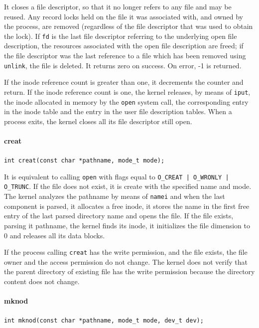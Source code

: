 \documentclass{report}
\begin{document}
It closes a file descriptor, so that it no longer refers to any file and may be reused. Any record locks held on the file it was associated with, and owned by the process, are removed (regardless of the file descriptor that was used to obtain the lock). If \texttt{fd} is the last file descriptor referring to the underlying open file description, the resources associated with the open file description are freed; if the file descriptor was the last reference to a file which has been removed using \texttt{unlink}, the file is deleted. It returns zero on success. On error, -1 is returned.

If the inode reference count is greater than one, it decrements the counter and return. If the inode reference count is one, the kernel releases, by means of \texttt{iput}, the inode allocated in memory by the \texttt{open} system call, the corresponding entry in the inode table and the entry in the user file description tables. When a process exits, the kernel closes all its file descriptor still open. 

\paragraph{creat}
\texttt{int creat(const char *pathname, mode\_t mode);}

It is equivalent to calling \texttt{open} with flags equal to \texttt{O\_CREAT | O\_WRONLY | O\_TRUNC}. If the file does not exist, it is create with the specified name and mode. The kernel analyzes the pathname by means of \texttt{namei} and when the last component is parsed, it allocates a free inode, it stores the name in the first free entry of the last parsed directory name and opens the file. If the file exists, parsing it pathname, the kernel finds its inode, it initializes the file dimension to 0 and releases all its data blocks.

If the process calling \texttt{creat} has the write permission, and the file exists, the file owner and the access permission do not change. The kernel does not verify that the parent directory of existing file has the write permission because the directory content does not change.

\paragraph{mknod}
\texttt{int mknod(const char *pathname, mode\_t mode, dev\_t dev);}
\end{document}
